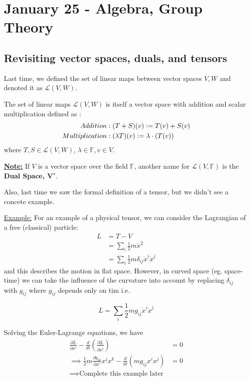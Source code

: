 \documentclass{article}
\newcommand{\defeq}{\vcentcolon=}
\begin{document}
\pagebreak
\section{January 25 - Algebra, Group Theory}

\vskip 1cm
\subsection{Revisiting vector spaces, duals, and tensors}
Last time, we defined the set of linear maps between vector spaces $V, W$ and denoted it as $\mathcal{L}(V, W)$.

\vskip 1cm
\begin{dottedbox}
  The set of linear maps $\mathcal{L}(V, W)$ is itself a vector space with addition and scalar multiplication defined as : 
  \begin{align*}
    Addition&: (T+S)(v) \defeq T(v) + S(v)\\
    Multiplication&: (\lambda T)(v) \defeq \lambda \cdot (T(v)) 
  \end{align*}
  where $T, S \in \mathcal{L}(V, W)$, $\lambda \in \mathbb{F}, v \in V$. 
\end{dottedbox}

\vskip 1cm
\underline{\textbf{Note:}} If $V$ is a vector space over the field $\mathbb{F}$, another name for $\mathcal{L}(V, \mathbb{F})$ is the \textbf{Dual Space, $\mathbf{V^{\star}}$}.


Also, last time we saw the formal definition of a tensor, but we didn't see a concete example.
\vskip 1cm
\begin{dottedbox}
  \underline{Example:} For an example of a physical tensor, we can consider the Lagrangian of a free (classical) particle:
  \begin{align*}
    L &= T - V \\
    &= \sum_{i} \frac{1}{2} m \dot{x}^2 \\
    &= \sum_{i} \frac{1}{2} m \delta_{ij} \dot{x}^i \dot{x}^j
  \end{align*}
  and this describes the motion in flat space. However, in curved space (eg. space-time) we can take the influence of the curvature into account by replacing $\delta_{ij}$ with $g_{ij}$ where $g_{ij}$ depends only on tim i.e.

  \[ \boxed{L = \sum_{i} \frac{1}{2} m g_{ij} \dot{x}^i \dot{x}^j} \]

  \vskip 1cm
  Solving the Euler-Lagrange equations, we have 
  \begin{align*}
    \frac{\partial L}{\partial x^i} - \frac{d}{dt}\left( \frac{\partial L}{\partial \dot{x^i}} \right) &= 0 \\
    \implies \frac{1}{2} m \frac{\partial g_{ik}}{\partial x^i}x^j x^k - \frac{d}{dt} \left( m g_{ij} x^i x^j \right) &= 0 \\
    \implies \text{Complete this example later}&
  \end{align*}  
\end{dottedbox}
\end{document}
